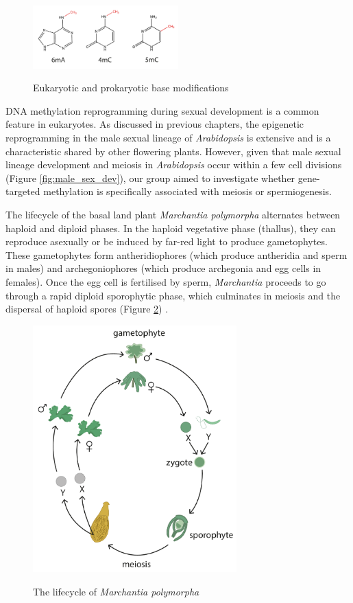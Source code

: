 \begin{figure}[htbp!] 
\centering    
    \includegraphics[width=0.5\textwidth]{Chapter3/Figs/Intro/base_mods.pdf}
\caption{Eukaryotic and prokaryotic base modifications}
\label{fig:base_mods}
\captionsetup{font=small}
    \caption*{}
\end{figure}

DNA methylation reprogramming during sexual development is a common feature in eukaryotes. As discussed in previous chapters, the epigenetic reprogramming in the male sexual lineage of \textit{Arabidopsis} is extensive and is a characteristic shared by other flowering plants. However, given that male sexual lineage development and meiosis in \textit{Arabidopsis} occur within a few cell divisions (Figure \ref{fig:male_sex_dev}), our group aimed to investigate whether gene-targeted methylation is specifically associated with meiosis or spermiogenesis.

The lifecycle of the basal land plant \textit{Marchantia polymorpha} alternates between haploid and diploid phases. In the haploid vegetative phase (thallus), they can reproduce asexually or be induced by far-red light to produce gametophytes. These gametophytes form antheridiophores (which produce antheridia and sperm in males) and archegoniophores (which produce archegonia and egg cells in females). Once the egg cell is fertilised by sperm, \textit{Marchantia} proceeds to go through a rapid diploid sporophytic phase, which culminates in meiosis and the dispersal of haploid spores (Figure \ref{fig:Mp_lifecycle}) \cite{RN143}.

\begin{figure}[htbp!] 
\centering    
    \includegraphics[width=0.7\textwidth]{Chapter3/Figs/Intro/Marchantia_lifecycle.pdf}
\caption{The lifecycle of \textit{Marchantia polymorpha}}
\label{fig:Mp_lifecycle}
\captionsetup{font=small}
    \caption*{}
\end{figure}

